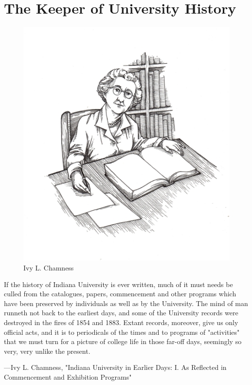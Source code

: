 \documentclass[
  american,
  letterpaper,
]{scrreprt}
\begin{document}
\chapter{The Keeper of University History}\label{sec-eight}

\begin{figure}[H]

{\centering \includegraphics[width=0.6\linewidth,height=\textheight,keepaspectratio]{images/miu8.jpeg}

}

\caption{Ivy L. Chamness}

\end{figure}%

\epigraph{
If the history of Indiana University is ever written, much of it must needs be culled from the catalogues, papers, commencement and other programs which have been preserved by individuals as well as by the University. The mind of man runneth not back to the earliest days, and some of the University records were destroyed in the fires of 1854 and 1883. Extant records, moreover, give us only official acts, and it is to periodicals of the times and to programs of "activities" that we must turn for a picture of college life in those far-off days, seemingly so very, very unlike the present.  }
{---Ivy L. Chamness, "Indiana University in Earlier Days: I. As Reflected in Commencement and Exhibition Programs"}
\end{document}
